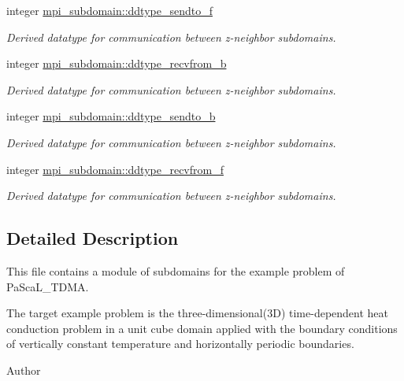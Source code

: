 \textbf{ }\par
\begin{DoxyCompactItemize}
\item 
integer \mbox{\hyperlink{namespacempi__subdomain_a4f3d66535b947c7afee75e6e73a47206}{mpi\+\_\+subdomain\+::ddtype\+\_\+sendto\+\_\+f}}
\begin{DoxyCompactList}\small\item\em Derived datatype for communication between z-\/neighbor subdomains. \end{DoxyCompactList}\item 
integer \mbox{\hyperlink{namespacempi__subdomain_ad6462f18c8c68c076005957e9d062252}{mpi\+\_\+subdomain\+::ddtype\+\_\+recvfrom\+\_\+b}}
\begin{DoxyCompactList}\small\item\em Derived datatype for communication between z-\/neighbor subdomains. \end{DoxyCompactList}\item 
integer \mbox{\hyperlink{namespacempi__subdomain_a7a2af0322a7aaa435951a5432859687a}{mpi\+\_\+subdomain\+::ddtype\+\_\+sendto\+\_\+b}}
\begin{DoxyCompactList}\small\item\em Derived datatype for communication between z-\/neighbor subdomains. \end{DoxyCompactList}\item 
integer \mbox{\hyperlink{namespacempi__subdomain_a4da19838e8bc3934ad5c24db424bec2c}{mpi\+\_\+subdomain\+::ddtype\+\_\+recvfrom\+\_\+f}}
\begin{DoxyCompactList}\small\item\em Derived datatype for communication between z-\/neighbor subdomains. \end{DoxyCompactList}\end{DoxyCompactItemize}



\subsection{Detailed Description}
This file contains a module of subdomains for the example problem of Pa\+Sca\+L\+\_\+\+T\+D\+MA. 

The target example problem is the three-\/dimensional(3D) time-\/dependent heat conduction problem in a unit cube domain applied with the boundary conditions of vertically constant temperature and horizontally periodic boundaries. \begin{DoxyAuthor}{Author}

\end{DoxyAuthor}

